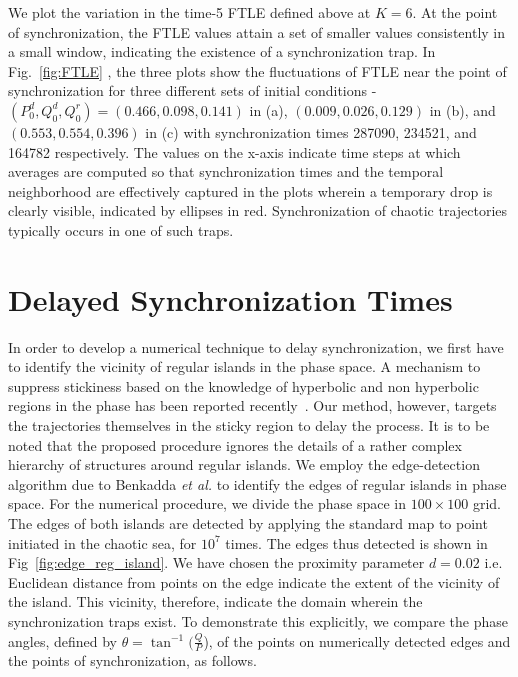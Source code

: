 \documentclass[reprint,amsmath,amssymb,aps,pre]{revtex4-1}
\begin{document}
We plot the variation in the time-5 FTLE defined above at $K = 6$. At the 
point of synchronization, the FTLE values attain a set of smaller values 
consistently in a small window, indicating the existence of a synchronization 
trap.  In Fig.~\ref{fig:FTLE} , the three plots show the fluctuations  of FTLE 
near the point of synchronization for three different sets of initial 
conditions - $(P^d_0,Q^d_0,Q^r_0) = (0.466,0.098,0.141)$ in (a),  
$(0.009,0.026,0.129)$ in (b), and $(0.553,0.554,0.396)$ in (c) with 
synchronization times 287090, 234521, and 164782 respectively. The values on 
the x-axis indicate time steps at which averages are computed so that 
synchronization times and the temporal neighborhood are effectively captured 
in the plots wherein a temporary drop is clearly visible, indicated by 
ellipses in red. Synchronization of chaotic trajectories typically occurs in 
one of such traps. 

\section{Delayed Synchronization Times}
\label{sec:delay}
In order to develop a numerical technique to delay synchronization, we  first 
have to identify the vicinity of regular islands in the phase space. A 
mechanism  to suppress stickiness based on the knowledge of hyperbolic and non 
hyperbolic regions in the phase has been reported recently~\cite{Kruger2015}. 
Our method, however, targets the trajectories themselves in the sticky region 
to delay the process.  It is to be noted that the proposed procedure ignores 
the details of a rather complex hierarchy of structures around regular 
islands. We employ the edge-detection algorithm due to Benkadda {\it et al.} 
\cite{Benkadda1997} to identify the edges of regular islands in phase space. 
For the numerical procedure, we divide the phase space in $100 \times 100$ 
grid. The edges of both islands are detected by applying the standard map 
to point initiated in the chaotic sea, for $10^7$ times.  The edges thus 
detected is shown in Fig~\ref{fig:edge_reg_island}.  We have chosen the 
proximity parameter $d=0.02$ i.e. Euclidean distance from points 
on the edge indicate the extent of the vicinity of the island.  This vicinity, 
therefore, indicate the domain wherein the synchronization traps exist.  To 
demonstrate this explicitly, we compare the phase angles, defined by $\theta = 
\tan^{-1}(\frac{Q}{P}$), of the points on numerically detected edges and 
the points of synchronization, as 
follows.
\end{document}
